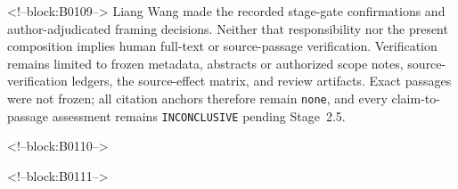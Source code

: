 \documentclass[11pt,a4paper]{article}
\begin{document}
<!--block:B0109-->
Liang Wang made the recorded stage-gate confirmations and author-adjudicated framing decisions. Neither that responsibility nor the present composition implies human full-text or source-passage verification. Verification remains limited to frozen metadata, abstracts or authorized scope notes, source-verification ledgers, the source-effect matrix, and review artifacts. Exact passages were not frozen; all citation anchors therefore remain \texttt{none}, and every claim-to-passage assessment remains \texttt{INCONCLUSIVE} pending Stage~2.5.

<!--block:B0110-->



<!--block:B0111-->
\end{document}
